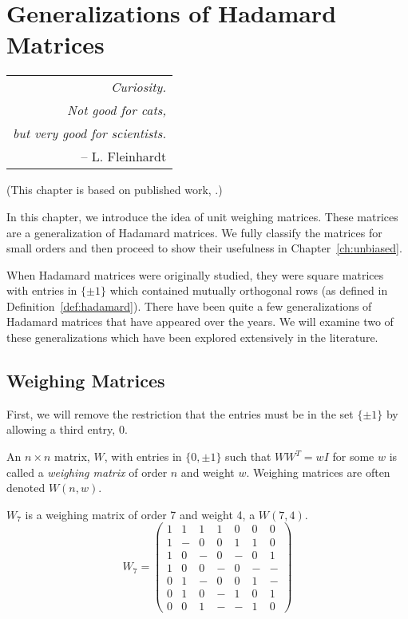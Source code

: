 \chapter[Generalizations of Hadamard Matrices]{Generalizations of Hadamard Matrices}
\label{ch:generalizations}

\hfill\begin{tabular}{r}\toprule
 {\it Curiosity.} \\ {\it Not good for cats,} \\ {\it but very good for scientists.} \\
 -- L. Fleinhardt\\
\bottomrule\end{tabular}\vskip25pt

(This chapter is based on published work, \cite{unit-weigh13}.)

In this chapter, we introduce the idea of unit weighing matrices. These matrices are a generalization of Hadamard matrices. We fully classify the matrices for small orders and then proceed to show their usefulness in Chapter~\ref{ch:unbiased}.

When Hadamard matrices were originally studied, they were square matrices with entries in $\{\pm1\}$ which contained mutually orthogonal rows (as defined in Definition~\ref{def:hadamard}). There have been quite a few generalizations of Hadamard matrices that have appeared over the years. We will examine two of these generalizations which have been explored extensively in the literature.

\section{Weighing Matrices}

First, we will remove the restriction that the entries must be in the set $\{\pm1\}$ by allowing a third entry, 0.

\begin{definition} \label{def:weigh}
 An $n \times n$ matrix, $W$, with entries in $\{0,\pm1\}$ such that $WW^T = wI$ for some $w$ is called a {\it weighing matrix} of order $n$ and weight $w$. Weighing matrices are often denoted $W(n,w)$.
\end{definition}

\begin{example} \label{ex:weigh}
$W_7$ is a weighing matrix of order 7 and weight 4, a $W(7,4)$.
$$W_7=\left(\begin{array}{ccccccc}
1 & 1 & 1 & 1 & 0 & 0 & 0 \\
1 & - & 0 & 0 & 1 & 1 & 0 \\
1 & 0 & - & 0 & - & 0 & 1 \\
1 & 0 & 0 & - & 0 & - & - \\
0 & 1 & - & 0 & 0 & 1 & - \\
0 & 1 & 0 & - & 1 & 0 & 1 \\
0 & 0 & 1 & - & - & 1 & 0
\end{array}\right)$$
\end{example}

